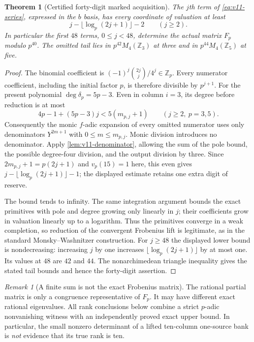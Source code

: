 \documentclass[11pt]{article}
\newtheorem{theorem}{Theorem}[section]
\theoremstyle{definition}
\theoremstyle{remark}
\newtheorem{remark}[remark]{Remark}
\newcommand{\Z}{\mathbb Z}
\begin{document}
\begin{theorem}[Certified forty-digit marked acquisition]
\label{thm:v11-tail}
The $j$th term of \cref{eq:v11-series}, expressed in the $b$ basis,
has every coordinate of valuation at least
\begin{equation}
 \boxed{j-\lfloor\log_p(2j+1)\rfloor-2\qquad(j\ge2).}
 \label{eq:v11-tail-floor}
\end{equation}
In particular the first $48$ terms, $0\le j<48$, determine the
actual matrix $F_p$ modulo $p^{40}$. The omitted tail lies in
$p^{42}M_4(\Z_3)$ at three and in $p^{44}M_4(\Z_5)$ at five.
\end{theorem}
\begin{proof}
The binomial coefficient is
$(-1)^j\binom{2j}{j}/4^j\in\Z_p$. Every numerator coefficient,
including the initial factor $p$, is therefore divisible by $p^{j+1}$.
For the present polynomial $\deg\delta_p=5p-3$. Even in column $i=3$,
its degree before reduction is at most
\[
 4p-1+(5p-3)j<5(m_{p,j}+1)\qquad(j\ge2,\ p=3,5).
\]
Consequently the monic $f$-adic expansion of every omitted numerator
uses only denominators $Y^{2m+1}$ with $0\le m\le m_{p,j}$.
Monic division introduces no denominator. Apply
\cref{lem:v11-denominator}, allowing the sum of the pole bound, the
possible degree-four division, and the output division by three.
Since $2m_{p,j}+1=p(2j+1)$ and $v_p(15)=1$ here, this even gives
$j-\lfloor\log_p(2j+1)\rfloor-1$; the displayed estimate retains
one extra digit of reserve.

The bound tends to infinity. The same integration argument bounds the
exact primitives with pole and degree growing only linearly in $j$;
their coefficients grow in valuation linearly up to a logarithm.
Thus the primitives converge in a weak completion, so reduction of the
convergent Frobenius lift is legitimate, as in the standard
Monsky--Washnitzer construction. For $j\ge48$ the displayed lower
bound is nondecreasing: increasing $j$ by one increases
$\lfloor\log_p(2j+1)\rfloor$ by at most one. Its values at $48$
are $42$ and $44$. The nonarchimedean triangle inequality gives the
stated tail bounds and hence the forty-digit assertion.
\end{proof}

\begin{remark}[A finite sum is not the exact Frobenius matrix]
The rational partial matrix is only a congruence representative of $F_p$.
It may have different exact rational eigenvalues. All rank conclusions
below combine a strict $p$-adic nonvanishing witness with an independently
proved exact upper bound. In particular, the small nonzero determinant
of a lifted ten-column one-source bank is \emph{not} evidence that its
true rank is ten.
\end{remark}
\end{document}
